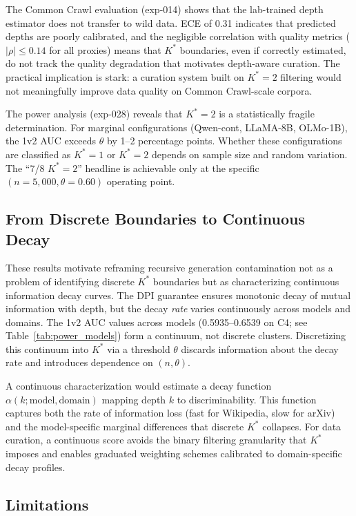 \documentclass[11pt,a4paper]{article}
\begin{document}
The Common Crawl evaluation (exp-014) shows that the lab-trained depth estimator does not transfer to wild data.
ECE of 0.31 indicates that predicted depths are poorly calibrated, and the negligible correlation with quality metrics ($|\rho| \leq 0.14$ for all proxies) means that $K^*$ boundaries, even if correctly estimated, do not track the quality degradation that motivates depth-aware curation.
The practical implication is stark: a curation system built on $K^*=2$ filtering would not meaningfully improve data quality on Common Crawl-scale corpora.

The power analysis (exp-028) reveals that $K^*=2$ is a statistically fragile determination.
For marginal configurations (Qwen-cont, LLaMA-8B, OLMo-1B), the 1v2 AUC exceeds $\theta$ by 1--2 percentage points.
Whether these configurations are classified as $K^*=1$ or $K^*=2$ depends on sample size and random variation.
The ``7/8 $K^*=2$'' headline is achievable only at the specific $(n=5{,}000, \theta=0.60)$ operating point.

\subsection{From Discrete Boundaries to Continuous Decay}

These results motivate reframing recursive generation contamination not as a problem of identifying discrete $K^*$ boundaries but as characterizing continuous information decay curves.
The DPI guarantee ensures monotonic decay of mutual information with depth, but the decay \emph{rate} varies continuously across models and domains.
The 1v2 AUC values across models (0.5935--0.6539 on C4; see Table~\ref{tab:power_models}) form a continuum, not discrete clusters.
Discretizing this continuum into $K^*$ via a threshold $\theta$ discards information about the decay rate and introduces dependence on $(n, \theta)$.

A continuous characterization would estimate a decay function $\alpha(k; \text{model}, \text{domain})$ mapping depth $k$ to discriminability.
This function captures both the rate of information loss (fast for Wikipedia, slow for arXiv) and the model-specific marginal differences that discrete $K^*$ collapses.
For data curation, a continuous score avoids the binary filtering granularity that $K^*$ imposes and enables graduated weighting schemes calibrated to domain-specific decay profiles.

\subsection{Limitations}
\end{document}
